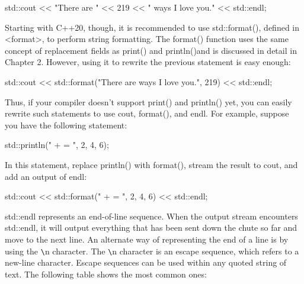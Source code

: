 \begin{cpp}
std::cout << "There are " << 219 << " ways I love you." << std::endl;
\end{cpp}

Starting with C++20, though, it is recommended to use std::format(), defined in <format>, to perform string formatting. The format() function uses the same concept of replacement fields as print() and println()and is discussed in detail in Chapter 2. However, using it to rewrite the previous statement is easy enough:

\begin{cpp}
std::cout << std::format("There are {} ways I love you.", 219) << std::endl;
\end{cpp}

Thus, if your compiler doesn’t support print() and println() yet, you can easily rewrite such statements to use cout, format(), and endl. For example, suppose you have the following statement:

\begin{cpp}
std::println("{} + {} = {}", 2, 4, 6);
\end{cpp}

In this statement, replace println() with format(), stream the result to cout, and add an output of endl:

\begin{cpp}
std::cout << std::format("{} + {} = {}", 2, 4, 6) << std::endl;
\end{cpp}

std::endl represents an end-of-line sequence. When the output stream encounters std::endl, it will output everything that has been sent down the chute so far and move to the next line. An alternate way of representing the end of a line is by using the \verb|\|n character. The \verb|\|n character is an escape sequence, which refers to a new-line character. Escape sequences can be used within any quoted string of text. The following table shows the most common ones:

